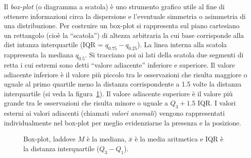 Il \emph{box-plot} (o diagramma a scatola) è uno strumento grafico utile al fine di ottenere informazioni circa la dispersione e l'eventuale simmetria o asimmetria di una distribuzione. 
Per costruire un box-plot si rappresenta sul piano cartesiano un rettangolo (cioè la ``scatola'') di altezza arbitraria la cui base corrisponde alla dist intanza interquartile (IQR = $q_{0.75} - q_{0.25}$). 
La linea interna alla scatola rappresenta la mediana $q_{0.5}$.
Si tracciano poi ai lati della scatola due segmenti di retta i cui estremi sono detti ``valore adiacente'' inferiore e superiore.
Il valore adiacente inferiore è il valore più piccolo tra le osservazioni che risulta maggiore o uguale al primo quartile meno la distanza corrispondente a 1.5 volte la distanza interquartile (si veda la figura~\ref{fig:boxplot}). 
Il valore adiacente superiore è il valore più grande tra le osservazioni che risulta minore o uguale a $Q_3+1.5$ IQR. 
I valori esterni ai valori adiacenti (chiamati \emph{valori anomali}) vengono rappresentati individualmente nel box-plot per meglio evidenziarne la presenza e la posizione.
\begin{figure}%
\centering
{}
\caption{Box-plot, laddove $M$ è la mediana, $\bar{x}$ è la media aritmetica e IQR è la distanza interquartile ($Q_3 - Q_1$).}
\label{fig:boxplot}
\end{figure}

